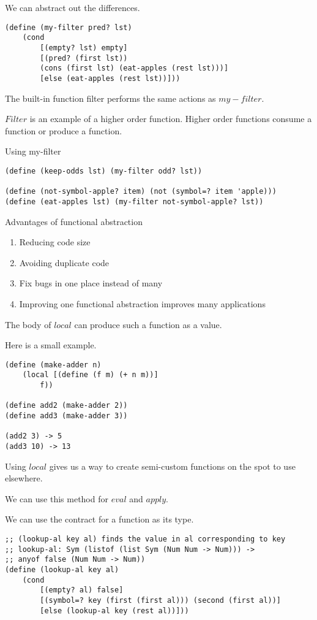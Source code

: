 \documentclass{article}
\begin{document}
We can abstract out the differences. 

\begin{lstlisting}
(define (my-filter pred? lst)
    (cond
        [(empty? lst) empty]
        [(pred? (first lst))
        (cons (first lst) (eat-apples (rest lst)))]
        [else (eat-apples (rest lst))]))
\end{lstlisting}

The built-in function filter performs the same actions as $my-filter$. 

$Filter$ is an example of a higher order function. Higher order functions consume a function or produce a function. 

Using my-filter
\begin{lstlisting}
(define (keep-odds lst) (my-filter odd? lst))

(define (not-symbol-apple? item) (not (symbol=? item 'apple)))
(define (eat-apples lst) (my-filter not-symbol-apple? lst))
\end{lstlisting}

Advantages of functional abstraction
\begin{enumerate}
    \item Reducing code size
    \item Avoiding duplicate code
    \item Fix bugs in one place instead of many
    \item Improving one functional abstraction improves many applications
\end{enumerate}

The body of $local$ can produce such a function as a value. 

Here is a small example.

\begin{lstlisting}
(define (make-adder n)
    (local [(define (f m) (+ n m))]
        f))

(define add2 (make-adder 2))
(define add3 (make-adder 3))

(add2 3) -> 5
(add3 10) -> 13
\end{lstlisting}

Using $local$ gives us a way to create semi-custom functions on the spot to use elsewhere. 

We can use this method for $eval$ and $apply$. 

We can use the contract for a function as its type. 

\begin{lstlisting}
;; (lookup-al key al) finds the value in al corresponding to key 
;; lookup-al: Sym (listof (list Sym (Num Num -> Num))) ->
;; anyof false (Num Num -> Num))
(define (lookup-al key al)
    (cond 
        [(empty? al) false]
        [(symbol=? key (first (first al))) (second (first al))]
        [else (lookup-al key (rest al))]))
\end{lstlisting}
\end{document}
